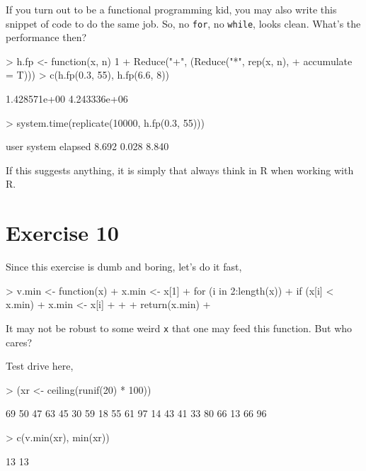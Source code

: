 \documentclass{article}
\begin{document}
If you turn out to be a functional programming kid, you may also write this
snippet of code to do the same job. So, no \verb=for=, no \verb=while=, looks clean. What's the performance then?
\begin{Schunk}
\begin{Sinput}
> h.fp <- function(x, n) 1 + Reduce("+", (Reduce("*", rep(x, n), 
+     accumulate = T)))
> c(h.fp(0.3, 55), h.fp(6.6, 8))
\end{Sinput}
\begin{Soutput}
[1] 1.428571e+00 4.243336e+06
\end{Soutput}
\begin{Sinput}
> system.time(replicate(10000, h.fp(0.3, 55)))
\end{Sinput}
\begin{Soutput}
   user  system elapsed 
  8.692   0.028   8.840 
\end{Soutput}
\end{Schunk}
If this suggests anything, it is simply that always think in R when working with R.

\section{Exercise 10}
Since this exercise is dumb and boring, let's do it fast,
\begin{Schunk}
\begin{Sinput}
> v.min <- function(x) {
+     x.min <- x[1]
+     for (i in 2:length(x)) {
+         if (x[i] < x.min) {
+             x.min <- x[i]
+         }
+     }
+     return(x.min)
+ }
\end{Sinput}
\end{Schunk}
It may not be robust to some weird \verb=x= that one may feed this function. But who cares? 

Test drive here,
\begin{Schunk}
\begin{Sinput}
> (xr <- ceiling(runif(20) * 100))
\end{Sinput}
\begin{Soutput}
 [1] 69 50 47 63 45 30 59 18 55 61 97 14 43 41 33 80 66 13 66 96
\end{Soutput}
\begin{Sinput}
> c(v.min(xr), min(xr))
\end{Sinput}
\begin{Soutput}
[1] 13 13
\end{Soutput}
\end{Schunk}
\end{document}
